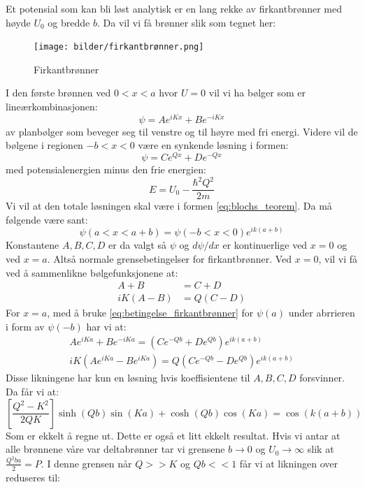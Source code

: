 \documentclass{article}
\begin{document}
Et potensial som kan bli løst analytisk er en lang rekke av firkantbrønner med høyde $U_0$ og bredde $b$. Da vil vi få brønner slik som tegnet her:
\begin{figure}[H]
    \centering
    \texttt{[image: bilder/firkantbrønner.png]}
    \caption{Firkantbrønner}
    \label{fig:firkantbrønner}
\end{figure}
I den første brønnen ved $0 < x < a$ hvor $U = 0$ vil vi ha bølger som er lineærkombinasjonen:
\begin{equation}
    \psi = Ae^{iKx} + Be^{-iKx}
\end{equation}
av planbølger som beveger seg til venstre og til høyre med fri energi. Videre vil de bølgene i regionen $-b < x < 0$ være en synkende løsning i formen:
\begin{equation*}
    \psi = Ce^{Qx} + De^{-Qx}
\end{equation*}
med potensialenergien minus den frie energien:
\begin{equation}
    E = U_0 - \frac{\hbar^2 Q^2}{2m} 
\end{equation}
Vi vil at den totale løsningen skal være i formen \ref{eq:blochs_teorem}. Da må følgende være sant:
\begin{equation}
    \label{eq:betingelse_firkantbrønner}
    \psi(a < x < a + b) = \psi(-b < x < 0)e^{ik(a+b)}
\end{equation}
Konstantene $A, B, C, D$ er da valgt så $\psi$ og $d\psi / dx$ er kontinuerlige ved $x = 0$ og ved $x = a$. Altså normale grensebetingelser for firkantbrønner. Ved $x = 0$, vil vi få ved å sammenlikne bølgefunksjonene at:
\begin{align}
    A + B &= C + D \\
    iK(A-B) &= Q(C-D)
\end{align}
For $x=a$, med å bruke \ref{eq:betingelse_firkantbrønner} for $\psi(a)$ under abrrieren i form av $\psi(-b)$ har vi at:
\begin{align}
    Ae^{iKa} + Be^{-iKa} = (Ce^{-Qb}+De^{Qb}) e^{ik(a+b)} \\
    iK(Ae^{iKa} - Be^{iKa}) = Q(Ce^{-Qb}-De^{Qb}) e^{ik(a+b)}
\end{align}
Disse likningene har kun en løsning hvis koeffisientene til $A,B,C,D$ forsvinner. Da får vi at:
\begin{equation}
    \left[\frac{Q^2-K^2}{2QK}\right] \sinh(Qb) \sin(Ka) + \cosh(Qb) \cos(Ka) = \cos(k(a+b))
\end{equation}
Som er ekkelt å regne ut. Dette er også et litt ekkelt resultat. Hvis vi antar at alle brønnene våre var deltabrønner tar vi grensene $b \rightarrow 0$ og $U_0 \rightarrow \infty$ slik at $\frac{Q^2 ba}{2}=P$. I denne grensen når $Q >> K$ og $Qb << 1$ får vi at likningen over reduseres til:
\end{document}
